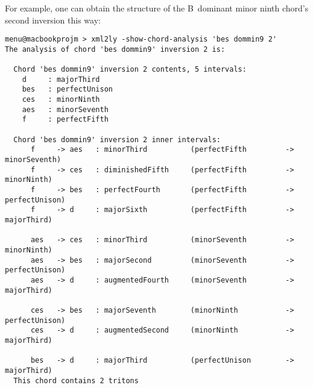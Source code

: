For example, one can obtain the structure of the B\Flat\ dominant minor ninth chord's second inversion this way:
\begin{lstlisting}[language=MusicXML]
menu@macbookprojm > xml2ly -show-chord-analysis 'bes dommin9 2'
The analysis of chord 'bes dommin9' inversion 2 is:

  Chord 'bes dommin9' inversion 2 contents, 5 intervals:
    d     : majorThird
    bes   : perfectUnison
    ces   : minorNinth
    aes   : minorSeventh
    f     : perfectFifth

  Chord 'bes dommin9' inversion 2 inner intervals:
      f     -> aes   : minorThird          (perfectFifth         -> minorSeventh)
      f     -> ces   : diminishedFifth     (perfectFifth         -> minorNinth)
      f     -> bes   : perfectFourth       (perfectFifth         -> perfectUnison)
      f     -> d     : majorSixth          (perfectFifth         -> majorThird)

      aes   -> ces   : minorThird          (minorSeventh         -> minorNinth)
      aes   -> bes   : majorSecond         (minorSeventh         -> perfectUnison)
      aes   -> d     : augmentedFourth     (minorSeventh         -> majorThird)

      ces   -> bes   : majorSeventh        (minorNinth           -> perfectUnison)
      ces   -> d     : augmentedSecond     (minorNinth           -> majorThird)

      bes   -> d     : majorThird          (perfectUnison        -> majorThird)
  This chord contains 2 tritons
\end{lstlisting}


